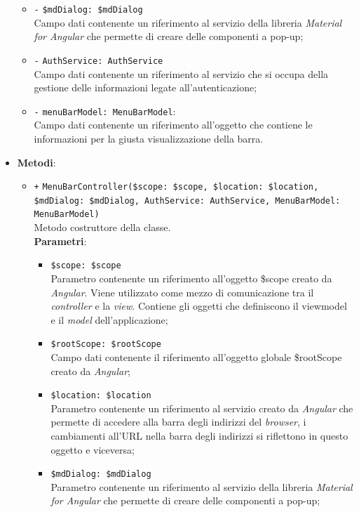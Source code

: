 \begin{itemize}
\begin{itemize}
		\item \texttt{-} \texttt{\$mdDialog: \$mdDialog} \\
		Campo dati contenente un riferimento al servizio della libreria \textit{Material for Angular} che permette di creare delle componenti a pop-up;
		\item \texttt{-} \texttt{AuthService: AuthService} \\
		Campo dati contenente un riferimento al servizio che si occupa della gestione delle informazioni legate all'autenticazione;
		\item \texttt{-} \texttt{menuBarModel: MenuBarModel}: \\
		Campo dati contenente un riferimento all'oggetto che contiene le informazioni per la giusta visualizzazione della barra.
	\end{itemize}
	\item \textbf{Metodi}:
	\begin{itemize}
		\item \texttt{+} \texttt{MenuBarController(\$scope: \$scope, \$location: \$location, \\ \$mdDialog:  \$mdDialog, AuthService: AuthService, MenuBarModel: MenuBarModel)} \\
		Metodo costruttore della classe. \\
		\textbf{Parametri}:
		\begin{itemize}
			\item \texttt{\$scope: \$scope} \\
			Parametro contenente un riferimento all’oggetto \$scope creato da \textit{Angular}. Viene utilizzato come mezzo di comunicazione tra il \textit{controller} e la \textit{view}. Contiene gli oggetti che definiscono il viewmodel e il \textit{model} dell'applicazione;
			\item \texttt{\$rootScope: \$rootScope} \\
			Campo dati contenente il riferimento all'oggetto globale \$rootScope creato da \textit{Angular};
			\item \texttt{\$location: \$location} \\
			Parametro contenente un riferimento al servizio creato da \textit{Angular} che permette di accedere alla barra degli indirizzi del \textit{browser}, i cambiamenti all’URL nella barra degli indirizzi si riflettono in questo oggetto e viceversa;
			\item \texttt{\$mdDialog: \$mdDialog} \\
			Parametro contenente un riferimento al servizio della libreria \textit{Material for Angular} che permette di creare delle componenti a pop-up;

\end{itemize}
\end{itemize}
\end{itemize}
